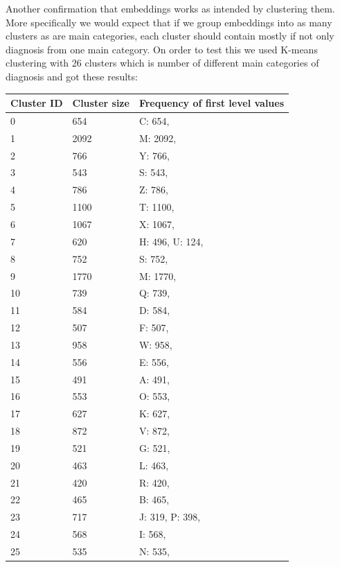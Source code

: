 Another confirmation that embeddings works as intended by clustering them. More specifically we would expect that if we group embeddings into as many clusters as are main categories, each cluster should contain mostly if not only diagnosis from one main category. On order to test this we used K-means clustering with 26 clusters which is number of different main categories of diagnosis and got these results:

\begin{table}[!h]
	\begin{tabular}{|p{}|p{}|p{}|}
		\hline
		Cluster ID & Cluster size & Frequency of first level values \\ \hline
		0 & 654 & C: 654, \\ \hline
		1 & 2092 & M: 2092, \\ \hline
		2 & 766 & Y: 766, \\ \hline
		3 & 543 & S: 543, \\ \hline
		4 & 786 & Z: 786, \\ \hline
		5 & 1100 & T: 1100, \\ \hline
		6 & 1067 & X: 1067, \\ \hline
		7 & 620 & H: 496, U: 124, \\ \hline
		8 & 752 & S: 752, \\ \hline
		9 & 1770 & M: 1770, \\ \hline
		10 & 739 & Q: 739, \\ \hline
		11 & 584 & D: 584, \\ \hline
		12 & 507 & F: 507, \\ \hline
		13 & 958 & W: 958, \\ \hline
		14 & 556 & E: 556, \\ \hline
		15 & 491 & A: 491, \\ \hline
		16 & 553 & O: 553, \\ \hline
		17 & 627 & K: 627, \\ \hline
		18 & 872 & V: 872, \\ \hline
		19 & 521 & G: 521, \\ \hline
		20 & 463 & L: 463, \\ \hline
		21 & 420 & R: 420, \\ \hline
		22 & 465 & B: 465, \\ \hline
		23 & 717 & J: 319, P: 398, \\ \hline
		24 & 568 & I: 568, \\ \hline
		25 & 535 & N: 535, \\ \hline
\end{tabular}
\end{table}

